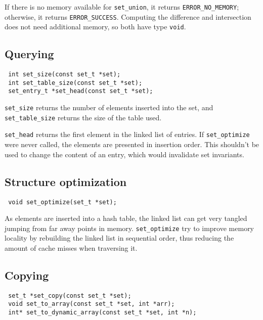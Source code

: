 If there is no memory available for \lstinline!set_union!, 
it returns \lstinline!ERROR_NO_MEMORY!; otherwise, it returns \lstinline!ERROR_SUCCESS!. Computing the difference and intersection 
does not need additional memory, so both have type \lstinline!void!.

\subsection{Querying}

\begin{lstlisting}
 int set_size(const set_t *set);
 int set_table_size(const set_t *set);
 set_entry_t *set_head(const set_t *set);
\end{lstlisting}

\lstinline!set_size! returns the number of elements inserted into the set, and \lstinline!set_table_size! returns the size of the
table used.

\lstinline!set_head! returns the first element in the linked list of entries. If \lstinline!set_optimize! were never called, the
elements are presented in insertion order. This shouldn't be used to change the content of an entry, which would invalidate set invariants.

\subsection{Structure optimization}

\begin{lstlisting}
 void set_optimize(set_t *set);
\end{lstlisting}

As elements are inserted into a hash table, the linked list can get very tangled jumping from far away points in memory. \lstinline!set_optimize!
try to improve memory locality by rebuilding the linked list in sequential order, thus reducing the amount of cache misses when traversing
it.

\subsection{Copying}

\begin{lstlisting}
 set_t *set_copy(const set_t *set);
 void set_to_array(const set_t *set, int *arr); 
 int* set_to_dynamic_array(const set_t *set, int *n);
\end{lstlisting}

